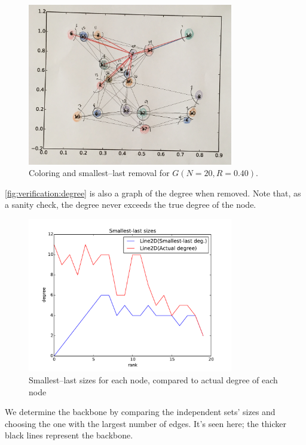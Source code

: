 \documentclass[oneside, titlepage]{scrartcl}
\begin{document}
\begin{figure}[h]
\centering
\includegraphics[width=0.8\textwidth]{figures/handdone.JPG}
\caption{Coloring and smallest--last removal for $G(N=20, R=0.40)$.}
\label{fig:verification:coloring}
\end{figure}

\autoref{fig:verification:degree} is also a graph of the degree when removed. Note that, as a sanity check, the degree never exceeds the true degree of the node.

\begin{figure}[h!]
\centering
\includegraphics[width=0.8\textwidth]{figures/ordering100.pdf}
\caption{Smallest--last sizes for each node, compared to actual degree of each node}
\label{fig:verification:degree}
\end{figure}


We determine the backbone by comparing the independent sets' sizes and choosing the one with the largest number of edges. It's seen here; the thicker black lines represent the backbone.
\end{document}
